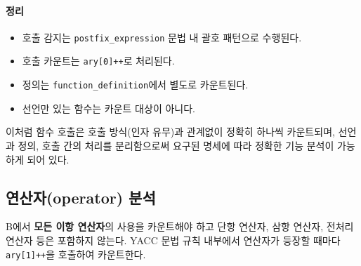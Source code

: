 \documentclass{article}
\begin{document}
\paragraph{정리}
\begin{itemize}
  \item 호출 감지는 \texttt{postfix\_expression} 문법 내 괄호 패턴으로 수행된다.
  \item 호출 카운트는 \texttt{ary[0]++}로 처리된다.
  \item 정의는 \texttt{function\_definition}에서 별도로 카운트된다.
  \item 선언만 있는 함수는 카운트 대상이 아니다.
\end{itemize}

이처럼 함수 호출은 호출 방식(인자 유무)과 관계없이 정확히 하나씩 카운트되며, 선언과 정의, 호출 간의 처리를 분리함으로써 요구된 명세에 따라 정확한 기능 분석이 가능하게 되어 있다.

\subsection{연산자(operator) 분석}

B에서 \textbf{모든 이항 연산자}의 사용을 카운트해야 하고 단항 연산자, 삼항 연산자, 전처리 연산자 등은 포함하지 않는다. YACC 문법 규칙 내부에서 연산자가 등장할 때마다 \texttt{ary[1]++}을 호출하여 카운트한다.
\end{document}
